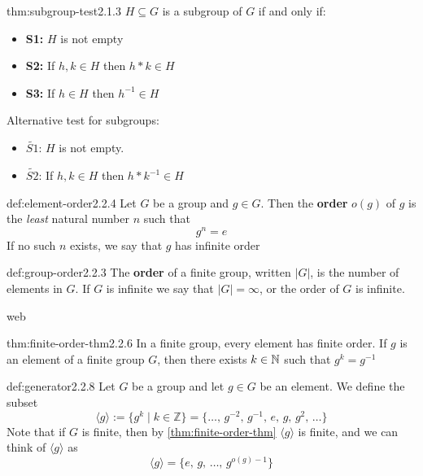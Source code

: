 \documentclass[landscape, 8pt]{extarticle}
\begin{document}
\begin{multicols}{3}
\begin{thm}{thm:subgroup-test}{2.1.3}
    $H\subseteq G$ is a subgroup of $G$ if and only if:
    \renewcommand\labelitemi{\tiny$\bullet$}
    \begin{itemize}
        \setlength\itemsep{0em}
        \item \textbf{S1:} $H$ is not empty
        \item \textbf{S2:} If $h,k\in H$ then $h\ast k\in H$
        \item \textbf{S3:} If $h\in H$ then $h^{-1}\in H$
    \end{itemize}
    Alternative test for subgroups:
    \renewcommand\labelitemi{\tiny$\bullet$}
    \begin{itemize}
        \setlength\itemsep{0em}
        \item $\widetilde{S1}$: $H$ is not empty.
        \item $\widetilde{S2}$: If $h,k\in H$ then $h*k^{-1}\in H$
    \end{itemize}
\end{thm}
\vspace{-5pt}

\begin{dfn}{def:element-order}{2.2.4}
    Let $G$ be a group and $g\in G$. Then the \textbf{order} $o(g)$ of $g$ is the \textit{least} natural number $n$ such that
    $$g^n = e$$
    If no such $n$ exists, we say that $g$ has infinite order
\end{dfn}
\vspace{-5pt}

\begin{dfn}{def:group-order}{2.2.3}
    The \textbf{order} of a finite group, written $\lvert G \rvert$, is the number of elements in $G$.
    If $G$ is infinite we say that $\lvert G \rvert = \infty$, or the order of $G$ is infinite.
\end{dfn}
\vspace{-5pt}
    web
\begin{thm}{thm:finite-order-thm}{2.2.6}
    In a finite group, every element has finite order.\newline
    If $g$ is an element of a finite group $G$, then there exists $k\in \mathbb{N}$ such that $g^{k} = g^{-1}$
\end{thm}
\vspace{-5pt}

\begin{dfn}{def:generator}{2.2.8}
    Let $G$ be a group and let $g\in G$ be an element. We define the subset
    $$\langle g \rangle := \{g^k \mid k\in\mathbb{Z}\} = \{\dots,\,g^{-2},\,g^{-1},\,e,\,g,\,g^{2},\,\dots \}$$
    Note that if $G$ is finite, then by \ref{thm:finite-order-thm} $\langle g \rangle$ is finite, and we can think of $\langle g \rangle$ as
    $$\langle g \rangle = \{e,\,g,\,\dots,\,g^{o(g)-1}\}$$
\end{dfn}
\vspace{-5pt}


\end{multicols}
\end{document}
